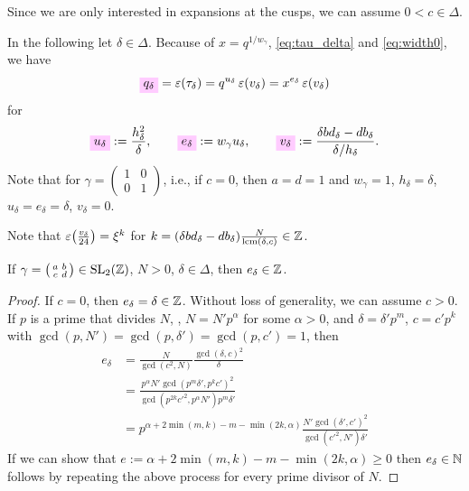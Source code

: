 \documentclass{article}
\begin{document}
\begin{Hemmecke}
Since we are only interested in expansions at the cusps, we can assume
$0<c\in\Delta$.

In the following let $\delta \in \Delta$. Because of
$x=q^{1/w_\gamma}$, \eqref{eq:tau_delta} and \eqref{eq:width0}, we
have
\begin{gather}
  \defineNotation[q-delta]{q_\delta} = \unityPower{\tau_\delta}
  = q^{u_\delta} \, \unityPower{v_\delta}
  = x^{e_\delta} \, \unityPower{v_\delta}
\label{eq:q_delta}
\end{gather}
for
\begin{gather}
  \defineNotation[u-delta]{u_\delta} :=
  \frac{h_\delta^2}{\delta},
  \qquad
  \defineNotation[e-delta]{e_\delta} :=
  w_\gamma u_\delta,
  \qquad
  \defineNotation[v-delta]{v_\delta} :=
  \frac{\delta b d_\delta-d b_\delta}{\delta/h_\delta}.
  \label{eq:uv_delta}
\end{gather}
Note that for
$\gamma=\left(\begin{smallmatrix}1&0\\0&1\end{smallmatrix}\right)$,
i.e., if $c=0$, then $a=d=1$ and
$w_\gamma=1$,
$h_\delta=\delta$, $u_\delta=e_\delta=\delta$, $v_\delta=0$.

%
Note that $\varepsilon\!\left(\frac{v_\delta}{24}\right) = \xi^k$ for
$k = (\delta b d_\delta - d b_\delta) \frac{N}{\operatorname{lcm}(\delta,c)}\in \mathbb{Z}$.

\begin{Lemma}
  If $\gamma =
\bigl(
\begin{smallmatrix}
  a & b\\
  c & d
\end{smallmatrix}
\bigr) \in \SL2Z$, $N > 0$, $\delta \in \Delta$, then
$e_\delta \in \mathbb{Z}$.
\end{Lemma}
\begin{proof}
If $c=0$, then $e_\delta=\delta\in\mathbb{Z}$. Without loss of generality,
we can assume $c>0$.
If $p$ is a prime that divides $N$, \ie, $N=N'p^\alpha$ for some
$\alpha>0$, and $\delta = \delta' p^m$, $c=c' p^k$ with
$\gcd(p,N')=\gcd(p,\delta')=\gcd(p,c')=1$, then
\begin{align*}
  e_\delta
  &=
  \frac{N}{\gcd(c^2,N)} \frac{\gcd(\delta,c)^2}{\delta}\\
  &=
  \frac{p^\alpha N' \gcd(p^m \delta', p^k c')^2}{\gcd(p^{2k}
    c'^2,p^\alpha N') p^m \delta'}\\
  &=
  p^{\alpha + 2 \min(m,k) - m - \min(2k, \alpha)}
  \frac{N' \gcd(\delta', c')^2}{\gcd(c'^2, N') \delta'}
\end{align*}
If we can show that $e:=\alpha + 2 \min(m,k) - m - \min(2k,
\alpha)\ge0$ then $e_\delta\in\mathbb{N}$ follows by repeating the above
process for every prime divisor of $N$.


\end{proof}
\end{Hemmecke}
\end{document}
